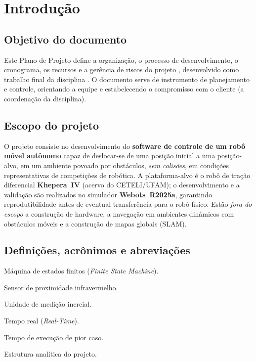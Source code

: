 
\newcommand{\tipodoc}{Plano de Projeto}
\newcommand{\datadoc}{16 de junho de 2026}


\fazcapa
\controleversoes
\tableofcontents
\newpage

\section{Introdução}
\subsection{Objetivo do documento}
Este Plano de Projeto define a organização, o processo de desenvolvimento, o cronograma, os recursos e a gerência de riscos do projeto \emph{\projnome}, desenvolvido como trabalho final da disciplina \disciplina. O documento serve de instrumento de planejamento e controle, orientando a equipe e estabelecendo o compromisso com o cliente (a coordenação da disciplina).

\subsection{Escopo do projeto}
O projeto consiste no desenvolvimento do \textbf{software de controle de um robô móvel autônomo} capaz de deslocar-se de uma posição inicial a uma posição-alvo, em um ambiente povoado por obstáculos, \emph{sem colisões}, em condições representativas de competições de robótica. A plataforma-alvo é o robô de tração diferencial \textbf{Khepera~IV} (acervo do CETELI/UFAM); o desenvolvimento e a validação são realizados no simulador \textbf{Webots~R2025a}, garantindo reprodutibilidade antes de eventual transferência para o robô físico. Estão \emph{fora do escopo} a construção de hardware, a navegação em ambientes dinâmicos com obstáculos móveis e a construção de mapas globais (SLAM).

\subsection{Definições, acrônimos e abreviações}
\begin{description}[style=nextline,leftmargin=1.2cm,font=\ttfamily]
  \item[FSM] Máquina de estados finitos (\emph{Finite State Machine}).
  \item[IR] Sensor de proximidade infravermelho.
  \item[IMU] Unidade de medição inercial.
  \item[RT] Tempo real (\emph{Real-Time}).
  \item[WCET] Tempo de execução de pior caso.
  \item[EAP] Estrutura analítica do projeto.
\end{description}

